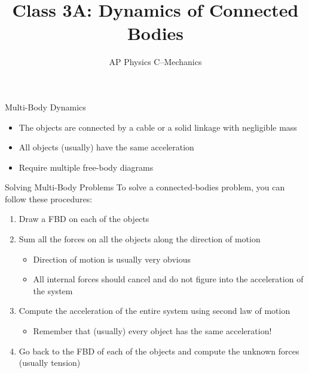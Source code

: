 \documentclass[12pt,compress,aspectratio=169]{beamer}
\title{Class 3A: Dynamics of Connected Bodies}
\subtitle{AP Physics C--Mechanics}
\begin{document}
\begin{frame}
  \maketitle
\end{frame}




\begin{frame}{Multi-Body Dynamics}
  \begin{center}
  \end{center}
  \begin{itemize}
  \item The objects are connected by a cable or a solid linkage with negligible
    mass
  \item All objects (usually) have the same acceleration
  \item Require multiple free-body diagrams
  \end{itemize}
\end{frame}



\begin{frame}{Solving Multi-Body Problems}
  To solve a connected-bodies problem, you can follow these procedures:
  \begin{enumerate}
  \item Draw a FBD on each of the objects
  \item Sum all the forces on all the objects along the direction of motion
    \begin{itemize}
    \item Direction of motion is usually very obvious
    \item All internal forces should cancel and do not figure into the
      acceleration of the system
    \end{itemize}
  \item Compute the acceleration of the entire system using second law of motion
    \begin{itemize}
    \item Remember that (usually) every object has the same acceleration!
    \end{itemize}
  \item Go back to the FBD of each of the objects and compute the unknown
    forces (usually tension)
  \end{enumerate}
\end{frame}
\end{document}
